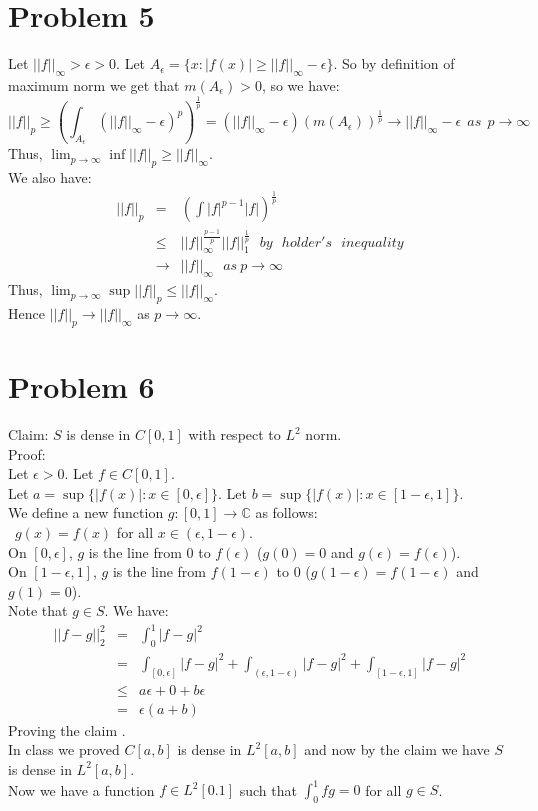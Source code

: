 \documentclass[12pt]{article}
\begin{document}
\clearpage
\section*{Problem 5}
Let $||f||_{\infty} > \epsilon >0$. Let $A_{\epsilon}=\{x: |f(x)| \ge ||f||_{\infty} - \epsilon\}$. So by definition of maximum norm we get that $m(A_{\epsilon}) >0$, so we have: 
$$||f||_p \ge \left(\int_{A_{\epsilon}} 
(||f||_{\infty}-\epsilon)^p \right)^{\frac{1}{p}}
=
(||f||_{\infty}-\epsilon)(m(A_{\epsilon}))^{\frac{1}{p}}
\rightarrow ||f||_{\infty}-\epsilon
\ \ as \ \ p \rightarrow \infty
$$
Thus, $\lim_{p \rightarrow \infty} \inf ||f||_p \ge ||f||_{\infty}$. \\
We also have:
\begin{eqnarray*}
||f||_p &=& 
\left( \int |f|^{p-1}|f| \right)^{\frac{1}{p}}
\\ &\le &
||f||_{\infty}^{\frac{p-1}{p}} ||f||_1^{\frac{1}{p}} \ \ \ by \ \ \ holder's \ \ \ inequality
\\ &\rightarrow &
||f||_{\infty} \ \ \ as \ p \rightarrow \infty
\end{eqnarray*}
Thus, $\lim_{p \rightarrow \infty} \sup ||f||_p \le ||f||_{\infty}$. \\
Hence $||f||_p \rightarrow ||f||_{\infty}$ as $p \rightarrow \infty$.



\clearpage
\section*{Problem 6}
Claim: $S$ is dense in $C[0,1]$ with respect to $L^2$ norm. \\
Proof: \\
Let $\epsilon >0$. Let $f \in C[0,1]$. \\ 
Let $a=\sup \{|f(x)|:x \in [0,\epsilon]\}$.
Let $b=\sup \{|f(x)|:x \in [1-\epsilon,1]\}$. \\
We define a new function $g: [0,1] \rightarrow \mathbb{C}$ as follows: \\\
$g(x)=f(x)$ for all $x \in (\epsilon,1-\epsilon)$.
\\
On $[0,\epsilon]$, $g$ is the line from $0$ to $f(\epsilon)$ ($g(0)=0$ and $g(\epsilon)=f(\epsilon)$). 
\\
On $[1-\epsilon,1]$, $g$ is the line from $f(1-\epsilon)$ to $0$ ($g(1-\epsilon)=f(1-\epsilon)$ and $g(1)=0$). \\
Note that $g \in S$. We have:
\begin{eqnarray*}
||f-g||_2^2 &=&
\int_0^1 |f-g|^2
\\ &=&
\int_{[0,\epsilon]} |f-g|^2 +
\int_{(\epsilon,1-\epsilon)} |f-g|^2 +
\int_{[1-\epsilon,1]} |f-g|^2
\\ &\le &
a\epsilon + 0 + b\epsilon
\\ &=&
\epsilon (a+b)
\end{eqnarray*}
Proving the claim . \\
In class we proved $C[a,b]$ is dense in $L^2[a,b]$ and now by the claim we have $S$ is dense in 
$L^2[a,b]$. \\
Now we have a function $f \in L^2[0.1]$ such that
$\int_0^1 fg =0$ for all $g \in S$. \\
\end{document}
